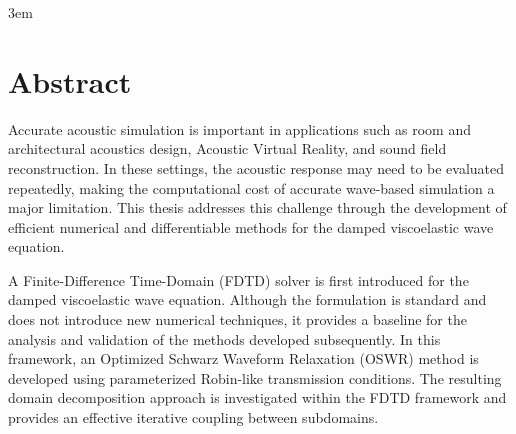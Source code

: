 \documentclass{Configuration_Files/PoliMi3i_thesis}
\begin{document}
\emergencystretch 3em



\pagestyle{empty} %
\frontmatter %


\startpreamble
\setcounter{page}{1} %

\chapter*{Abstract}

Accurate acoustic simulation is important in applications such as
room and architectural acoustics design, Acoustic Virtual Reality,
and sound field reconstruction. In these settings, the acoustic
response may need to be evaluated repeatedly, making the computational
cost of accurate wave-based simulation a major limitation. This thesis
addresses this challenge through the development of efficient numerical
and differentiable methods for the damped viscoelastic wave equation.

A Finite-Difference Time-Domain (FDTD) solver is first introduced for
the damped viscoelastic wave equation. Although the formulation is
standard and does not introduce new numerical techniques, it provides
a baseline for the analysis and validation of the methods developed
subsequently. In this framework, an Optimized Schwarz Waveform
Relaxation (OSWR) method is developed using parameterized Robin-like
transmission conditions. The resulting domain decomposition approach
is investigated within the FDTD framework and provides an effective
iterative coupling between subdomains.
\end{document}
